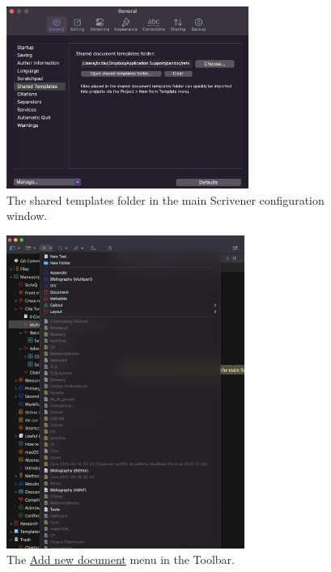 \documentclass[
  12pt,
  a4paper,
  oneside,
  numbers=noenddot,
  titlepage,
  toclink=all,
  toc=bibliography]{scrbook}
\theoremstyle{definition}
\theoremstyle{definition}
\theoremstyle{definition}
\theoremstyle{plain}
\theoremstyle{plain}
\theoremstyle{plain}
\theoremstyle{plain}
\theoremstyle{plain}
\theoremstyle{remark}
\begin{document}
\begin{figure}

{\centering \includegraphics[width=3.11458in,height=2.34375in]{shared-templates.png}

}

\caption{\label{fig-scriv42A}The shared templates folder in the main
Scrivener configuration window.}

\end{figure}

\begin{figure}

{\centering \includegraphics[width=3.0625in,height=4.03125in]{create-new-file.png}

}

\caption{\label{fig-scriv42B}The \ul{Add new document} menu in the
Toolbar.}

\end{figure}
\end{document}
